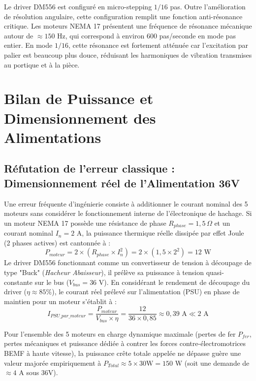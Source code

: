 Le driver DM556 est configuré en micro-stepping $1/16$ pas. Outre l'amélioration de résolution angulaire, cette configuration remplit une fonction anti-résonance critique. Les moteurs NEMA 17 présentent une fréquence de résonance mécanique autour de $\approx 150 \text{ Hz}$, qui correspond à environ 600 pas/seconde en mode pas entier. En mode $1/16$, cette résonance est fortement atténuée car l'excitation par palier est beaucoup plus douce, réduisant les harmoniques de vibration transmises au portique et à la pièce.

\section{Bilan de Puissance et Dimensionnement des Alimentations}

\subsection{Réfutation de l'erreur classique : Dimensionnement réel de l'Alimentation 36V}
Une erreur fréquente d'ingénierie consiste à additionner le courant nominal des 5 moteurs sans considérer le fonctionnement interne de l'électronique de hachage. Si un moteur NEMA 17 possède une résistance de phase $R_{phase} = 1{,}5\,\Omega$ et un courant nominal $I_n = 2\text{ A}$, la puissance thermique réelle dissipée par effet Joule (2 phases actives) est cantonnée à :
\begin{equation}
    P_{moteur} = 2 \times (R_{phase} \times I_n^2) = 2 \times (1{,}5 \times 2^2) = \boxed{12\text{ W}}
\end{equation}
Le driver DM556 fonctionnant comme un convertisseur de tension à découpage de type "Buck" (\textit{Hacheur Abaisseur}), il prélève sa puissance à tension quasi-constante sur le bus ($V_{bus} = 36\text{ V}$). En considérant le rendement de découpage du driver ($\eta \approx 85\%$), le courant réel prélevé sur l'alimentation (PSU) en phase de maintien pour un moteur s'établit à :
\begin{equation}
    I_{PSU\_par\_moteur} = \frac{P_{moteur}}{V_{bus} \times \eta} = \frac{12}{36 \times 0{,}85} \approx \boxed{0{,}39\text{ A}} \ll 2\text{ A}
\end{equation}

Pour l'ensemble des 5 moteurs en charge dynamique maximale (pertes de fer $P_{fer}$, pertes mécaniques et puissance dédiée à contrer les forces contre-électromotrices BEMF à haute vitesse), la puissance crête totale appelée ne dépasse guère une valeur majorée empiriquement à $P_{Total} \approx 5 \times 30\text{W} = 150\text{ W}$ (soit une demande de $\approx 4\text{ A}$ sous 36V).


